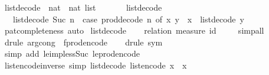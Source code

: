 \begin{isabellebody}
\isanewline
{}\isamarkupfalse%
\ list{\isacharunderscore}decode\ {\isacharcolon}{\isacharcolon}\ {\isachardoublequoteopen}nat\ {\isasymRightarrow}\ nat\ list{\isachardoublequoteclose}\isanewline
\ \ \isanewline
\ \ \ \ {\isachardoublequoteopen}list{\isacharunderscore}decode\ {}\ {\isacharequal}\ {\isacharbrackleft}{\isacharbrackright}{\isachardoublequoteclose}\isanewline
\ \ {\isacharbar}\ {\isachardoublequoteopen}list{\isacharunderscore}decode\ {\isacharparenleft}Suc\ n{\isacharparenright}\ {\isacharequal}\ {\isacharparenleft}case\ prod{\isacharunderscore}decode\ n\ of\ {\isacharparenleft}x{\isacharcomma}\ y{\isacharparenright}\ {\isasymRightarrow}\ x\ {\isacharhash}\ list{\isacharunderscore}decode\ y{\isacharparenright}{\isachardoublequoteclose}\isanewline
%
\isadelimproof
\ \ %
\endisadelimproof
%
\isatagproof
{}\isamarkupfalse%
\ pat{\isacharunderscore}completeness\ auto%
\endisatagproof
{\isafoldproof}%
%
\isadelimproof
\isanewline
%
\endisadelimproof
\isanewline
{}\isamarkupfalse%
\ list{\isacharunderscore}decode\isanewline
%
\isadelimproof
\ \ %
\endisadelimproof
%
\isatagproof
{}\isamarkupfalse%
\ {\isacharparenleft}relation\ {\isachardoublequoteopen}measure\ id{\isachardoublequoteclose}{\isacharparenright}\isanewline
\ \ \ \isamarkupfalse%
\ simp{\isacharunderscore}all\isanewline
\ \ \isamarkupfalse%
\ {\isacharparenleft}drule\ arg{\isacharunderscore}cong\ {\isacharbrackleft}\ f{\isacharequal}{\isachardoublequoteopen}prod{\isacharunderscore}encode{\isachardoublequoteclose}{\isacharbrackright}{\isacharparenright}\isanewline
\ \ \isamarkupfalse%
\ {\isacharparenleft}drule\ sym{\isacharparenright}\isanewline
\ \ \isamarkupfalse%
\ {\isacharparenleft}simp\ add{\isacharcolon}\ le{\isacharunderscore}imp{\isacharunderscore}less{\isacharunderscore}Suc\ le{\isacharunderscore}prod{\isacharunderscore}encode{\isacharunderscore}{}{\isacharparenright}\isanewline
\ \ \isamarkupfalse%
%
\endisatagproof
{\isafoldproof}%
%
\isadelimproof
\isanewline
%
\endisadelimproof
\isanewline
{}\isamarkupfalse%
\ list{\isacharunderscore}encode{\isacharunderscore}inverse\ {\isacharbrackleft}simp{\isacharbrackright}{\isacharcolon}\ {\isachardoublequoteopen}list{\isacharunderscore}decode\ {\isacharparenleft}list{\isacharunderscore}encode\ x{\isacharparenright}\ {\isacharequal}\ x{\isachardoublequoteclose}\isanewline
%
\isadelimproof
\ \ %
\endisadelimproof

\end{isabellebody}
